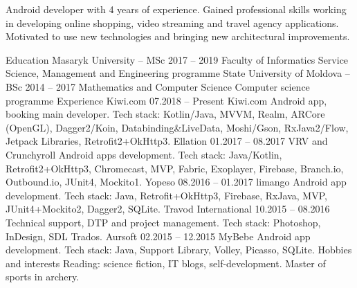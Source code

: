\documentclass[12pt, a4paper]{article}
\begin{document}
\hfill
\begin{minipage}{0.6\textwidth}
    Android developer with 4 years of experience. Gained professional
    skills working in developing online shopping, video streaming and
    travel agency applications. Motivated to use new technologies and
    bringing new architectural improvements.
    
    Education
    Masaryk University – MSc 2017 – 2019
    Faculty of Informatics
    Service Science, Management and Engineering programme
    State University of Moldova – BSc 2014 – 2017
    Mathematics and Computer Science
    Computer science programme
    Experience
    Kiwi.com 07.2018 – Present
    Kiwi.com Android app, booking main developer.
    Tech stack: Kotlin/Java, MVVM, Realm, ARCore (OpenGL),
    Dagger2/Koin, Databinding\&LiveData, Moshi/Gson,
    RxJava2/Flow, Jetpack Libraries, Retrofit2+OkHttp3.
    Ellation 01.2017 – 08.2017
    VRV and Crunchyroll Android apps development.
    Tech stack: Java/Kotlin, Retrofit2+OkHttp3, Chromecast, MVP,
    Fabric, Exoplayer, Firebase, Branch.io, Outbound.io, JUnit4,
    Mockito1.
    Yopeso 08.2016 – 01.2017
    limango Android app development.
    Tech stack: Java, Retrofit+OkHttp3, Firebase, RxJava, MVP,
    JUnit4+Mockito2, Dagger2, SQLite.
    Travod International 10.2015 – 08.2016
    Technical support, DTP and project management.
    Tech stack: Photoshop, InDesign, SDL Trados.
    Aursoft 02.2015 – 12.2015
    MyBebe Android app development.
    Tech stack: Java, Support Library, Volley, Picasso, SQLite.
    Hobbies and interests
    Reading: science fiction, IT blogs, self-development.
    Master of sports in archery.
\end{minipage}
\end{document}
